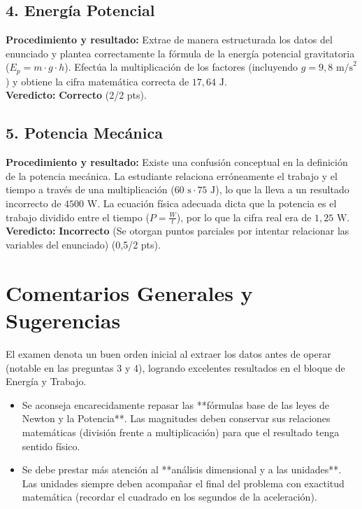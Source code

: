 \documentclass[12pt,letterpaper]{article}
\begin{document}
\subsection*{4. Energía Potencial}
\textbf{Procedimiento y resultado:} Extrae de manera estructurada los datos del enunciado y plantea correctamente la fórmula de la energía potencial gravitatoria ($E_p = m \cdot g \cdot h$). Efectúa la multiplicación de los factores (incluyendo $g = 9,8 \text{ m/s}^2$) y obtiene la cifra matemática correcta de $17,64 \text{ J}$. \\
\textbf{Veredicto:} \textbf{Correcto} (2/2 pts).

\subsection*{5. Potencia Mecánica}
\textbf{Procedimiento y resultado:} Existe una confusión conceptual en la definición de la potencia mecánica. La estudiante relaciona erróneamente el trabajo y el tiempo a través de una multiplicación ($60 \text{ s} \cdot 75 \text{ J}$), lo que la lleva a un resultado incorrecto de $4500 \text{ W}$. La ecuación física adecuada dicta que la potencia es el trabajo dividido entre el tiempo ($P = \frac{W}{t}$), por lo que la cifra real era de $1,25 \text{ W}$. \\
\textbf{Veredicto:} \textbf{Incorrecto} (Se otorgan puntos parciales por intentar relacionar las variables del enunciado) (0,5/2 pts).

\vspace{0.5cm}
\section*{Comentarios Generales y Sugerencias}
El examen denota un buen orden inicial al extraer los datos antes de operar (notable en las preguntas 3 y 4), logrando excelentes resultados en el bloque de Energía y Trabajo.
\begin{itemize}
    \item Se aconseja encarecidamente repasar las **fórmulas base de las leyes de Newton y la Potencia**. Las magnitudes deben conservar sus relaciones matemáticas (división frente a multiplicación) para que el resultado tenga sentido físico.
    \item Se debe prestar más atención al **análisis dimensional y a las unidades**. Las unidades siempre deben acompañar el final del problema con exactitud matemática (recordar el cuadrado en los segundos de la aceleración).
\end{itemize}
\end{document}
